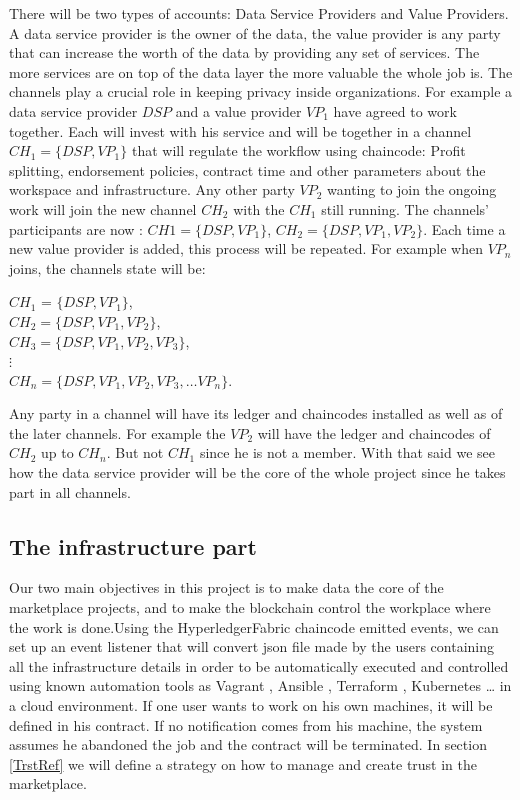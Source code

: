 \documentclass[conference]{IEEEtran}
\begin{document}
There will be two types of accounts: Data Service Providers and Value Providers. A data service provider is the owner of the data, the value provider is any party that can increase the worth of the data by providing any set of services. The more services are on top of the data layer the more valuable the whole job is.
The channels play a crucial role in keeping privacy inside organizations. For example a data service provider $DSP$ and a value provider $VP_1$ have agreed to work together. Each will invest with his service and will be together in a channel $CH_1=\{DSP, VP_1\}$ that will regulate the workflow using chaincode: Profit splitting, endorsement policies, contract time and other parameters about the workspace and infrastructure. Any other party $VP_2$ wanting to join the ongoing work will join the new channel $CH_2$ with the $CH_1$ still running. The channels’ participants are now : $CH1 =\{DSP, VP_1\}$, $CH_2 =\{DSP, VP_1, VP_2\}$. Each time a new value provider is added, this process will be repeated. For example when $VP_n$ joins, the channels state will be:
\begin{center}
$CH_1$ = $\{DSP, VP_1\}$,\\[5pt]
$CH_2 = \{DSP, VP_1, VP_2\}$,\\[5pt]
$CH_3 = \{DSP, VP_1, VP_2, VP_3\}$,\\[5pt]
	$\vdots$\\[5pt]
$CH_n = \{DSP, VP_1, VP_2, VP_3, … VP_n\}$.
\end{center}

Any party in a channel will have its ledger and chaincodes installed as well as of the later channels. For example the $VP_2$ will have the ledger and chaincodes of $CH_2$ up to $CH_n$. But not $CH_1$ since he is not a member. With that said we see how the data service provider will be the core of the whole project since he takes part in all channels.


\subsection{The infrastructure part}\label{EvRef}
Our two main objectives in this project is to make data the core of the marketplace projects, and to make the blockchain control the workplace where the work is done.Using the HyperledgerFabric chaincode emitted events, we can set up an event listener that will convert json file made by the users containing all the infrastructure details in order to be automatically executed and controlled using known automation\cite{houde2021gestion} tools as Vagrant \cite{hashimoto2013vagrant}, Ansible \cite{hochstein2017ansible}, Terraform \cite{brikman2019terraform}, Kubernetes\cite{burns2019kubernetes} … in a cloud environment. If one user wants to work on his own machines, it will be defined in his contract. If no notification comes from his machine, the system assumes he abandoned the job and the contract will be terminated. In section \ref{TrstRef} we will define a strategy on how to manage and create trust in the marketplace.
\end{document}
